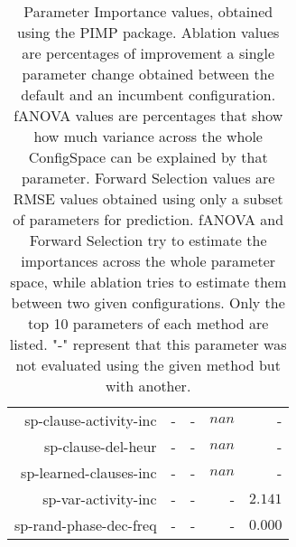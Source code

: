 \begin{table}
\begin{tabular}{r|r|r|r|r}
sp-clause-activity-inc      &                 - &                 - & $            nan$ &                 -\\
sp-clause-del-heur          &                 - &                 - & $            nan$ &                 -\\
sp-learned-clauses-inc      &                 - &                 - & $            nan$ &                 -\\
sp-var-activity-inc         &                 - &                 - &                 - & $          2.141$\\
sp-rand-phase-dec-freq      &                 - &                 - &                 - & $          0.000$\\
\bottomrule
\end{tabular}
\caption{Parameter Importance values, obtained using the PIMP package. Ablation values are percentages of improvement a single parameter change obtained between the default and an incumbent configuration.
fANOVA values are percentages that show how much variance across the whole ConfigSpace can be explained by that parameter.
Forward Selection values are RMSE values obtained using only a subset of parameters for prediction.
fANOVA and Forward Selection try to estimate the importances across the whole parameter space, while ablation tries to estimate them between two given configurations.
Only the top 10 parameters of each method are listed.
                    "-" represent that this parameter was not evaluated
                     using the given method but with another.
                    }
\label{tab:pimp}
\end{table}
